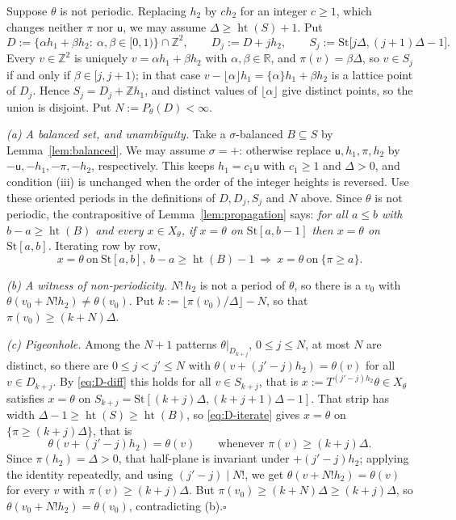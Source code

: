 \documentclass[11pt,reqno]{amsart}
\theoremstyle{plain}
\theoremstyle{definition}
\theoremstyle{remark}
\theoremstyle{plain}
\theoremstyle{remark}
\theoremstyle{definition}
\numberwithin{equation}{section}
\newcommand{\R}{\mathbb{R}}
\newcommand{\Z}{\mathbb{Z}}
\newcommand{\su}{\mathsf{u}}
\begin{document}
Suppose $\theta$ is not periodic.  Replacing $h_2$ by $ch_2$ for an integer
$c\ge1$, which changes neither $\pi$ nor $\su$, we may assume
$\Delta\ge\operatorname{ht}(S)+1$.  Put
\[D:=\{\alpha h_1+\beta h_2:\ \alpha,\beta\in[0,1)\}\cap\Z^2,\qquad
D_j:=D+jh_2,\qquad S_j:=\mathrm{St}\bigl[j\Delta,(j+1)\Delta-1\bigr].\]
Every $v\in\Z^2$ is uniquely $v=\alpha h_1+\beta h_2$ with $\alpha,\beta\in\R$,
and $\pi(v)=\beta\Delta$, so $v\in S_j$ if and only if $\beta\in[j,j+1)$; in that
case $v-\lfloor\alpha\rfloor h_1=\{\alpha\}h_1+\beta h_2$ is a lattice point of
$D_j$.  Hence $S_j=D_j+\Z h_1$, and distinct values of $\lfloor\alpha\rfloor$
give distinct points, so the union is disjoint.  Put $N:=P_\theta(D)<\infty$.

\emph{(a) A balanced set, and unambiguity.}  Take a $\sigma$-balanced
$B\subseteq S$ by Lemma~\ref{lem:balanced}.  We may assume $\sigma=+$: otherwise
replace $\su,h_1,\pi,h_2$ by $-\su,-h_1,-\pi,-h_2$, respectively.  This
keeps $h_1=c_1\su$ with $c_1\ge1$ and $\Delta>0$, and condition (iii) is
unchanged when the order of the integer heights is reversed.  Use these
oriented periods in the definitions of $D,D_j,S_j$ and $N$ above.
Since $\theta$ is not
periodic, the contrapositive of Lemma~\ref{lem:propagation} says: \emph{for all
$a\le b$ with $b-a\ge\operatorname{ht}(B)$ and every $x\in X_\theta$, if
$x=\theta$ on $\mathrm{St}[a,b-1]$ then $x=\theta$ on $\mathrm{St}[a,b]$.}
Iterating row by row,
\begin{equation}
x=\theta\ \text{on}\ \mathrm{St}[a,b],\ b-a\ge\operatorname{ht}(B)-1
\ \Longrightarrow\ x=\theta\ \text{on}\ \{\pi\ge a\}.
\label{eq:D-iterate}
\end{equation}

\emph{(b) A witness of non-periodicity.}  $N!\,h_2$ is not a period of $\theta$,
so there is a $v_0$ with $\theta(v_0+N!h_2)\ne\theta(v_0)$.  Put
$k:=\lfloor\pi(v_0)/\Delta\rfloor-N$, so that $\pi(v_0)\ge(k+N)\Delta$.

\emph{(c) Pigeonhole.}  Among the $N+1$ patterns $\theta|_{D_{k+j}}$,
$0\le j\le N$, at most $N$ are distinct, so there are $0\le j<j'\le N$ with
$\theta(v+(j'-j)h_2)=\theta(v)$ for all $v\in D_{k+j}$.  By \eqref{eq:D-diff}
this holds for all $v\in S_{k+j}$, that is
$x:=T^{(j'-j)h_2}\theta\in X_\theta$ satisfies $x=\theta$ on
$S_{k+j}=\mathrm{St}[(k+j)\Delta,(k+j+1)\Delta-1]$.  That strip has width
$\Delta-1\ge\operatorname{ht}(S)\ge\operatorname{ht}(B)$, so
\eqref{eq:D-iterate} gives $x=\theta$ on $\{\pi\ge(k+j)\Delta\}$, that is
\[\theta(v+(j'-j)h_2)=\theta(v)\qquad\text{whenever }\pi(v)\ge(k+j)\Delta .\]
Since $\pi(h_2)=\Delta>0$, that half-plane is invariant under $+(j'-j)h_2$;
applying the identity repeatedly, and using $(j'-j)\mid N!$, we get
$\theta(v+N!h_2)=\theta(v)$ for every $v$ with $\pi(v)\ge(k+j)\Delta$.  But
$\pi(v_0)\ge(k+N)\Delta\ge(k+j)\Delta$, so $\theta(v_0+N!h_2)=\theta(v_0)$,
contradicting (b).\hfill$\square$
\end{document}
